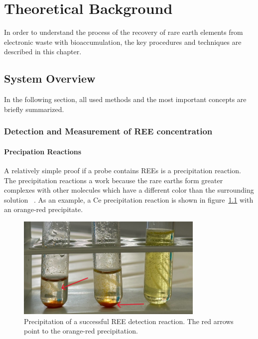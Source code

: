\chapter{Theoretical Background}
In order to understand the process of the recovery of rare earth elements from electronic waste with bioaccumulation, the key procedures and techniques are described in this chapter.


\section{System Overview}
In the following section, all used methods and the most important concepts are briefly summarized.


\subsection{Detection and Measurement of REE concentration\authorA}

\subsubsection{Precipation Reactions}
A relatively simple proof if a probe contains REEs is a precipitation reaction.
The precipitation reactions a work because the rare earths form greater complexes with other molecules which have a different color than the surrounding solution ~\cite{janderblasius}.
As an example, a Ce precipitation reaction is shown in figure~\ref{fig:cer_precipitation_cropped} with an orange-red precipitate.

\begin{figure}[H]
    \centering
    \includegraphics[width=0.8\textwidth]{./media/images/ree_precipitation_reaction_cropped}
    \caption{Precipitation of a successful REE detection reaction. The red arrows point to the orange-red precipitation.}
    \label{fig:cer_precipitation_cropped}
\end{figure}

